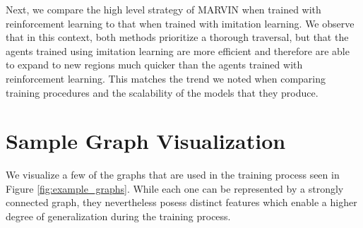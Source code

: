 

Next, we compare the high level strategy of MARVIN when trained with reinforcement learning to that
when trained with imitation learning. We observe that in this context, both methods prioritize a
thorough traversal, but that the agents trained using imitation learning are more efficient and
therefore are able to expand to new regions much quicker than the agents trained with reinforcement
learning. This matches the trend we noted when comparing training procedures and the scalability of
the models that they produce.



\section{Sample Graph Visualization}

We visualize a few of the graphs that are used in the training process seen in Figure \ref{fig:example_graphs}.
While each one can be represented by a strongly connected graph, they nevertheless posess distinct
features which enable a higher degree of generalization during the training process.

